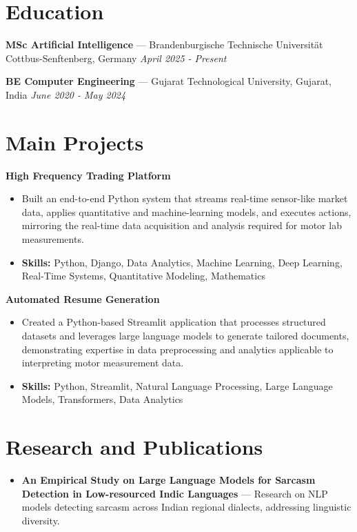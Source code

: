 \documentclass[a4paper,10pt]{article}
\begin{document}
\section*{Education}
\textbf{MSc Artificial Intelligence} — Brandenburgische Technische Universität Cottbus-Senftenberg, Germany \hfill \textit{April 2025 - Present}\par
\vspace{1.5pt}
\textbf{BE Computer Engineering} — Gujarat Technological University, Gujarat, India \hfill \textit{June 2020 - May 2024}\par

\section*{Main Projects}
\textbf{High Frequency Trading Platform}\par
\vspace{1pt}
\begin{itemize}
  \item Built an end-to-end Python system that streams real-time sensor-like market data, applies quantitative and machine-learning models, and executes actions, mirroring the real-time data acquisition and analysis required for motor lab measurements.
  \item \textbf{Skills:} Python, Django, Data Analytics, Machine Learning, Deep Learning, Real-Time Systems, Quantitative Modeling, Mathematics
\end{itemize}
\vspace{3pt}
\textbf{Automated Resume Generation}\par
\vspace{1pt}
\begin{itemize}
  \item Created a Python-based Streamlit application that processes structured datasets and leverages large language models to generate tailored documents, demonstrating expertise in data preprocessing and analytics applicable to interpreting motor measurement data.
  \item \textbf{Skills:} Python, Streamlit, Natural Language Processing, Large Language Models, Transformers, Data Analytics
\end{itemize}

\section*{Research and Publications}
\begin{itemize}
\item \textbf{An Empirical Study on Large Language Models for Sarcasm Detection in Low-resourced Indic Languages} — Research on NLP models detecting sarcasm across Indian regional dialects, addressing linguistic diversity.
\end{itemize}
\end{document}
